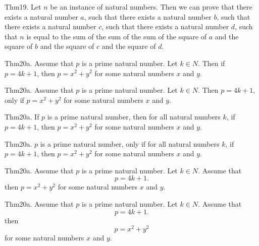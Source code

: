 \documentclass{article}
\begin{document}
Thm19. Let $n$ be an instance of natural numbers. Then we can prove that there exists a natural number $a$, such that there exists a natural number $b$, such that there exists a natural number $c$, such that there exists a natural number $d$, such that $n$ is equal to the sum of the sum of the sum of the square of $a$ and the square of $b$ and the square of $c$ and the square of $d$.

Thm20a. Assume that $p$ is a prime natural number. Let $k \in N$. Then if $p = 4 k + 1$, then $p = x ^{ 2}+ y ^{ 2}$ for some natural numbers $x$ and $y$.

Thm20a. Assume that $p$ is a prime natural number. Let $k \in N$. Then $p = 4 k + 1$, only if $p = x ^{ 2}+ y ^{ 2}$ for some natural numbers $x$ and $y$.

Thm20a. If $p$ is a prime natural number, then for all natural numbers $k$, if $p = 4 k + 1$, then $p = x ^{ 2}+ y ^{ 2}$ for some natural numbers $x$ and $y$.

Thm20a. $p$ is a prime natural number, only if for all natural numbers $k$, if $p = 4 k + 1$, then $p = x ^{ 2}+ y ^{ 2}$ for some natural numbers $x$ and $y$.

Thm20a. Assume that $p$ is a prime natural number. Let $k \in N$. Assume that $$p = 4 k + 1.$$ then $p = x ^{ 2}+ y ^{ 2}$ for some natural numbers $x$ and $y$.

Thm20a. Assume that $p$ is a prime natural number. Let $k \in N$. Assume that $$p = 4 k + 1.$$ then $$p = x ^{ 2}+ y ^{ 2}$$ for some natural numbers $x$ and $y$.
\end{document}
